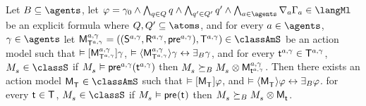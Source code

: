\begin{lemma}\label{aaml-s5-covers}
Let $\agentsB \subseteq \agents$, 
let $\phi = \gamma_0 \land \bigwedge_{\atomQ \in \atomsQ} \atomQ \land \bigwedge_{\atomQ' \in \atomsQ'} \atomQ' \land \bigwedge_{\agentA \in \agents} \coverA \Gamma_\agentA \in \langMl$ be an explicit formula where $\atomsQ, \atomsQ' \subseteq \atoms$, and 
for every $\agentA \in \agents$, $\gamma \in \agents$
let $\aPModelAndTuple[\agentA, \gamma]{\aStatesT[\agentA, \gamma]} \in \classAmS$ be an action model such that 
$\entails \actionA{\aPModel[\agentA, \gamma]{\aStatesT[\agentA, \gamma]}} \gamma$,
$\entails \actionE{\aPModel[\agentA, \gamma]{\aStatesT[\agentA, \gamma]}} \gamma \iff \someactsBs \gamma$, and
for every $\aStateT[\agentA, \gamma] \in \aStatesT[\agentA, \gamma]$, $\kPModel{\kStateS} \in \classS$ if $\kPModel{\kStateS} \entails \aPrecondition[\agentA, \gamma](\aStateT[\agentA, \gamma])$ then $\kPModel{\kStateS} \simulatesBs \kPModel{\kStateS} \exec \aPModel[\agentA, \gamma]{\aStateT[\agentA, \gamma]}$.
Then there exists an action model $\aPModel{\aStatesT} \in \classAmS$ such that 
$\entails \actionA{\aPModel{\aStatesT}} \phi$, and 
$\entails \actionE{\aPModel{\aStatesT}} \phi \iff \someactsBs \phi$.
for every $\aStateT \in \aStatesT$, $\kPModel{\kStateS} \in \classS$ if $\kPModel{\kStateS} \entails \aPrecondition(\aStateT)$ then $\kPModel{\kStateS} \simulatesBs \kPModel{\kStateS} \exec \aPModel{\aStateT}$.
\end{lemma}

